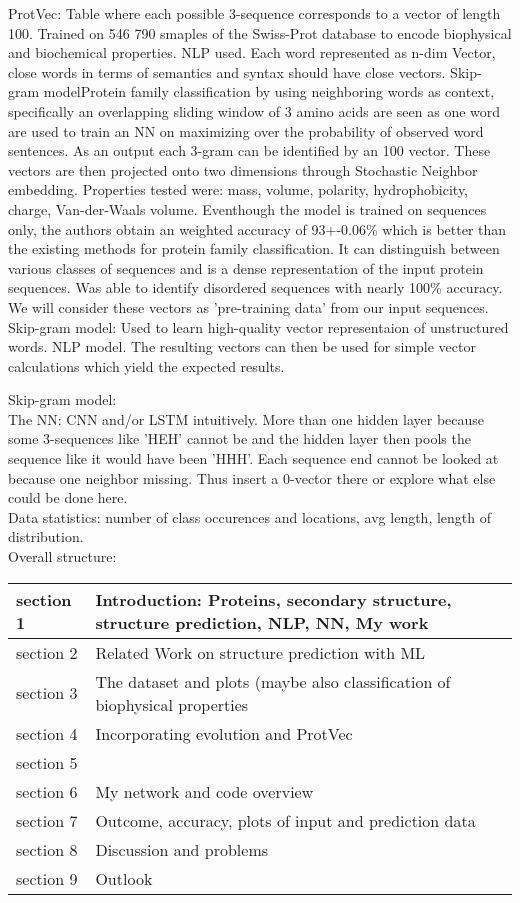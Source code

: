 \documentclass{article}
\begin{document}
ProtVec: Table where each possible 3-sequence corresponds to a vector of length 100. Trained on 546 790 smaples of the Swiss-Prot database to encode biophysical and biochemical properties. NLP used. Each word represented as n-dim Vector, close words in terms of semantics and syntax should have close vectors. Skip-gram modelProtein family classification by using neighboring words as context, specifically an overlapping sliding window of 3 amino acids are seen as one word are used to train an NN on maximizing over the probability of observed word sentences. As an output each 3-gram can be identified by an 100 vector. These vectors are then projected onto two dimensions through Stochastic Neighbor embedding. Properties tested were: mass, volume, polarity, hydrophobicity, charge, Van-der-Waals volume. Eventhough the model is trained on sequences only, the authors obtain an weighted accuracy of 93+-0.06\% which is better than the existing methods for protein family classification. It can distinguish between various classes of sequences and is a dense representation of the input protein sequences. Was able to identify disordered sequences with nearly 100\% accuracy. We will consider these vectors as 'pre-training data' from our input sequences.
Skip-gram model: Used to learn high-quality vector representaion of unstructured words. NLP model. The resulting vectors can then be used for simple vector calculations which yield the expected results.

Skip-gram model:\\

The NN: CNN and/or LSTM intuitively. More than one hidden layer because some 3-sequences like 'HEH' cannot be and the hidden layer then pools the sequence like it would have been 'HHH'. Each sequence end cannot be looked at because one neighbor missing. Thus insert a 0-vector there or explore what else could be done here.\\

Data statistics: number of class occurences and locations, avg length, length of distribution.\\

Overall structure:\\

\begin{tabular}{| l | p{10cm} |}
\hline
section 1 & Introduction: Proteins, secondary structure, structure prediction, NLP, NN, My work\\ \hline
section 2 & Related Work on structure prediction with ML \\ \hline
section 3 & The dataset and plots (maybe also classification of biophysical properties\\ \hline
section 4 & Incorporating evolution and ProtVec\\ \hline
section 5 & \\ \hline
section 6 & My network and code overview\\ \hline
section 7 & Outcome, accuracy, plots of input and prediction data\\ \hline
section 8 &	Discussion and problems\\ \hline
section 9 & Outlook\\ \hline
\end{tabular}
\end{document}
